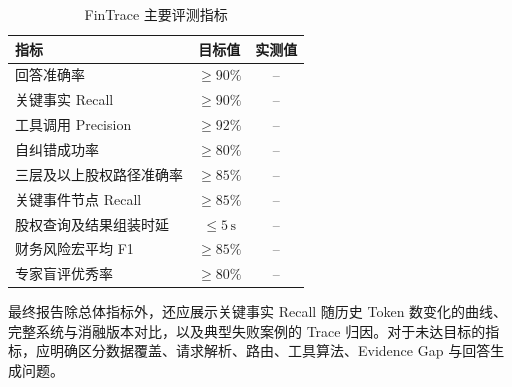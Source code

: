 \begin{table}[htbp]
    \centering
    \caption{FinTrace 主要评测指标}
    \label{tab:overall_results}
    \begin{tabular}{lcc}
        \toprule
        指标 & 目标值 & 实测值 \\
        \midrule
        回答准确率 & $\geq 90\%$ & -- \\
        关键事实 Recall & $\geq 90\%$ & -- \\
        工具调用 Precision & $\geq 92\%$ & -- \\
        自纠错成功率 & $\geq 80\%$ & -- \\
        三层及以上股权路径准确率 & $\geq 85\%$ & -- \\
        关键事件节点 Recall & $\geq 85\%$ & -- \\
        股权查询及结果组装时延 & $\leq 5\,\mathrm{s}$ & -- \\
        财务风险宏平均 F1 & $\geq 85\%$ & -- \\
        专家盲评优秀率 & $\geq 80\%$ & -- \\
        \bottomrule
    \end{tabular}
\end{table}

最终报告除总体指标外，还应展示关键事实 Recall 随历史 Token 数变化的曲线、完整系统与消融版本对比，以及典型失败案例的 Trace 归因。对于未达目标的指标，应明确区分数据覆盖、请求解析、路由、工具算法、Evidence Gap 与回答生成问题。

